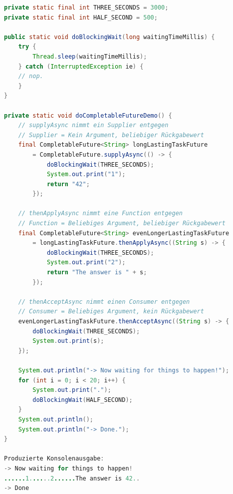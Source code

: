 \begin{lstlisting}[language=Java, caption=CompletableFuture]
private static final int THREE_SECONDS = 3000;
private static final int HALF_SECOND = 500;

public static void doBlockingWait(long waitingTimeMillis) {
	try {
		Thread.sleep(waitingTimeMillis);
	} catch (InterruptedException ie) {
	// nop.
	}
}

private static void doCompletableFutureDemo() {
	// supplyAsync nimmt ein Supplier entgegen
	// Supplier = Kein Argument, beliebiger Rückgabewert
	final CompletableFuture<String> longLastingTaskFuture
		= CompletableFuture.supplyAsync(() -> {
			doBlockingWait(THREE_SECONDS);
			System.out.print("1");
			return "42";
		});
		
	// thenApplyAsync nimmt eine Function entgegen
	// Function = Beliebiges Argument, beliebiger Rückgabewert
	final CompletableFuture<String> evenLongerLastingTaskFuture
		= longLastingTaskFuture.thenApplyAsync((String s) -> {
			doBlockingWait(THREE_SECONDS);
			System.out.print("2");
			return "The answer is " + s;
		});
	
	// thenAcceptAsync nimmt einen Consumer entgegen
	// Consumer = Beliebiges Argument, kein Rückgabewert
	evenLongerLastingTaskFuture.thenAcceptAsync((String s) -> {
		doBlockingWait(THREE_SECONDS);
		System.out.print(s);
	});
	
	System.out.println("-> Now waiting for things to happen!");
	for (int i = 0; i < 20; i++) {
		System.out.print(".");
		doBlockingWait(HALF_SECOND);
	}
	System.out.println();
	System.out.println("-> Done.");
}

Produzierte Konsolenausgabe:
-> Now waiting for things to happen!
......1......2......The answer is 42..
-> Done
\end{lstlisting}
